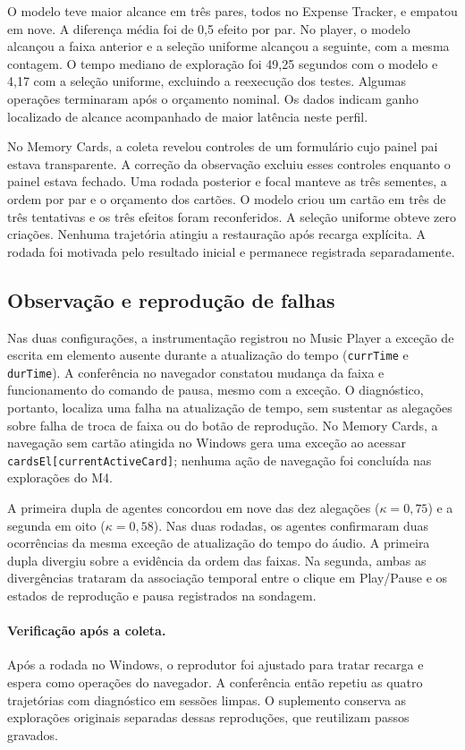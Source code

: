 \documentclass[12pt]{article}
\begin{document}
O modelo teve maior alcance em três pares, todos no Expense Tracker, e empatou em nove. A diferença média foi de 0,5 efeito por par. No player, o modelo alcançou a faixa anterior e a seleção uniforme alcançou a seguinte, com a mesma contagem. O tempo mediano de exploração foi 49,25 segundos com o modelo e 4,17 com a seleção uniforme, excluindo a reexecução dos testes. Algumas operações terminaram após o orçamento nominal. Os dados indicam ganho localizado de alcance acompanhado de maior latência neste perfil.

No Memory Cards, a coleta revelou controles de um formulário cujo painel pai estava transparente. A correção da observação excluiu esses controles enquanto o painel estava fechado. Uma rodada posterior e focal manteve as três sementes, a ordem por par e o orçamento dos cartões. O modelo criou um cartão em três de três tentativas e os três efeitos foram reconferidos. A seleção uniforme obteve zero criações. Nenhuma trajetória atingiu a restauração após recarga explícita. A rodada foi motivada pelo resultado inicial e permanece registrada separadamente.

\subsection{Observação e reprodução de falhas}
Nas duas configurações, a instrumentação registrou no Music Player a exceção de escrita em elemento ausente durante a atualização do tempo (\texttt{currTime} e \texttt{durTime}). A conferência no navegador constatou mudança da faixa e funcionamento do comando de pausa, mesmo com a exceção. O diagnóstico, portanto, localiza uma falha na atualização de tempo, sem sustentar as alegações sobre falha de troca de faixa ou do botão de reprodução. No Memory Cards, a navegação sem cartão atingida no Windows gera uma exceção ao acessar \texttt{cardsEl[currentActiveCard]}; nenhuma ação de navegação foi concluída nas explorações do M4.

A primeira dupla de agentes concordou em nove das dez alegações (\(\kappa=0{,}75\)) e a segunda em oito (\(\kappa=0{,}58\)). Nas duas rodadas, os agentes confirmaram duas ocorrências da mesma exceção de atualização do tempo do áudio. A primeira dupla divergiu sobre a evidência da ordem das faixas. Na segunda, ambas as divergências trataram da associação temporal entre o clique em Play/Pause e os estados de reprodução e pausa registrados na sondagem.

\paragraph{Verificação após a coleta.} Após a rodada no Windows, o reprodutor foi ajustado para tratar recarga e espera como operações do navegador. A conferência então repetiu as quatro trajetórias com diagnóstico em sessões limpas. O suplemento conserva as explorações originais separadas dessas reproduções, que reutilizam passos gravados.
\end{document}

